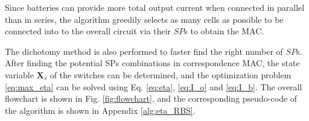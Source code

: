 \documentclass{article}
\begin{document}
Since batteries can provide more total output current when connected in parallel than in series, the algorithm greedily selects as many cells as possible to be connected into to the overall circuit via their $SP$s to obtain the MAC.

The dichotomy method is also performed to faster find the right number of $SP$s. %
After finding the potential SPs combinations in correspondence MAC, the state variable $\bm{X}_s$ of the switches can be determined, and the optimization problem \ref{eq:max_eta} can be solved using Eq. \ref{eq:eta}, \ref{eq:I_o} and \ref{eq:I_b}.
The overall flowchart is shown in Fig. \ref{fig:flowchart}, and the corresponding pseudo-code of the algorithm is shown in Appendix \ref{alg:eta_RBS}. %
\end{document}
